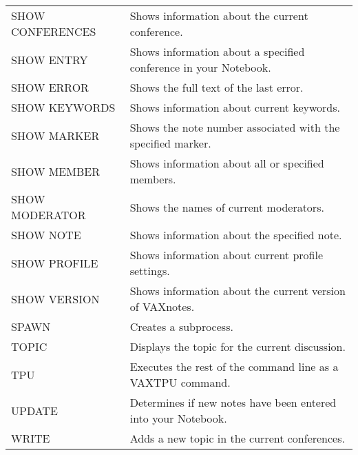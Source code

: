 \begin{tabular}{ l l }
SHOW CONFERENCES	& Shows information about the current conference.\\
SHOW ENTRY		& Shows information about a specified conference in your Notebook.\\
SHOW ERROR		& Shows the full text of the last error.\\
SHOW KEYWORDS		& Shows information about current keywords.\\
SHOW MARKER		& Shows the note number associated with the specified marker.\\
SHOW MEMBER		& Shows information about all or specified members.\\
SHOW MODERATOR		& Shows the names of current moderators.\\
SHOW NOTE		& Shows information about the specified note.\\
SHOW PROFILE		& Shows information about current profile settings.\\
SHOW VERSION		& Shows information about the current version of VAXnotes.\\
SPAWN			& Creates a subprocess.\\
TOPIC			& Displays the topic for the current discussion.\\
TPU			& Executes the rest of the command line as a VAXTPU command.\\
UPDATE			& Determines if new notes have been entered into your Notebook.\\
WRITE			& Adds a new topic in the current conferences.\\
\end{tabular}


